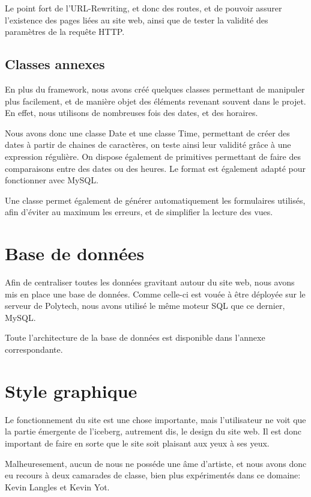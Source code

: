 Le point fort de l'URL-Rewriting, et donc des routes, et de pouvoir assurer l'existence des pages liées au site web,
ainsi que de tester la validité des paramètres de la requête HTTP.

        \subsection{Classes annexes}

En plus du framework, nous avons créé quelques classes permettant de manipuler plus facilement, et de manière objet
des éléments revenant souvent dans le projet. En effet, nous utilisons de nombreuses fois des dates, et des horaires.

Nous avons donc une classe Date et une classe Time, permettant de créer des dates à partir de chaines de caractères,
on teste ainsi leur validité grâce à une expression régulière. On dispose également de primitives permettant de
faire des comparaisons entre des dates ou des heures. Le format est également adapté pour fonctionner avec MySQL.

Une classe permet également de générer automatiquement les formulaires utilisés, afin d'éviter au maximum les erreurs,
et de simplifier la lecture des vues.



    \section{Base de données}
    Afin de centraliser toutes les données gravitant autour du site web, nous avons
mis en place une base de données. Comme celle-ci est vouée à être déployée sur le 
serveur de Polytech, nous avons utilisé le même moteur SQL que ce dernier, MySQL.

Toute l'architecture de la base de données est disponible dans l'annexe correspondante.

    \section{Style graphique}
Le fonctionnement du site est une chose importante, mais l'utilisateur ne voit que
la partie émergente de l'iceberg, autrement dis, le design du site web. Il est donc
important de faire en sorte que le site soit plaisant aux yeux à ses yeux. 

Malheuresement, aucun de nous ne posséde une âme d'artiste, et nous avons donc eu
recours à deux camarades de classe, bien plus expérimentés dans ce domaine: Kevin
Langles et Kevin Yot.

